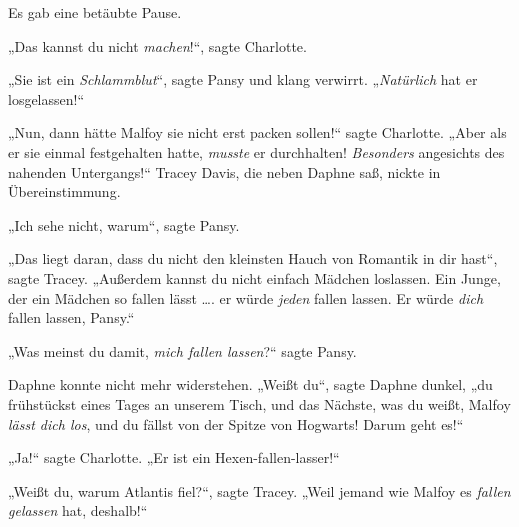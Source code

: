Es gab eine betäubte Pause.

„Das kannst du nicht \emph{machen}!“, sagte Charlotte.

„Sie ist ein \emph{Schlammblut}“, sagte Pansy und klang verwirrt.
„\emph{Natürlich} hat er losgelassen!“

„Nun, dann hätte Malfoy sie nicht erst packen sollen!“ sagte Charlotte.
„Aber als er sie einmal festgehalten hatte, \emph{musste} er durchhalten! \emph{Besonders} angesichts des nahenden Untergangs!“ Tracey Davis, die neben Daphne saß, nickte in Übereinstimmung.

„Ich sehe nicht, warum“, sagte Pansy.

„Das liegt daran, dass du nicht den kleinsten Hauch von Romantik in dir hast“, sagte Tracey.
„Außerdem kannst du nicht einfach Mädchen loslassen. Ein Junge, der ein Mädchen so fallen lässt …. er würde \emph{jeden} fallen lassen. Er würde \emph{dich} fallen lassen, Pansy.“

„Was meinst du damit, \emph{mich fallen lassen}?“ sagte Pansy.

Daphne konnte nicht mehr widerstehen.
„Weißt du“, sagte Daphne dunkel, „du frühstückst eines Tages an unserem Tisch, und das Nächste, was du weißt, Malfoy \emph{lässt dich los}, und du fällst von der Spitze von Hogwarts! Darum geht es!“

„Ja!“ sagte Charlotte.
„Er ist ein Hexen-fallen-lasser!“

„Weißt du, warum Atlantis fiel?“, sagte Tracey.
„Weil jemand wie Malfoy es \emph{fallen gelassen} hat, deshalb!“

